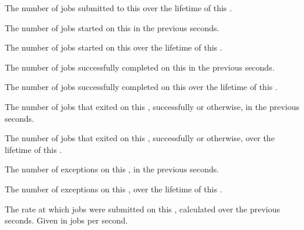 \begin{description}
\item[\AdAttr{JobsSubmittedCumulative}:] The number of jobs submitted to
  this  over the lifetime of this .

\item[\AdAttr{JobsStarted}:] The number of jobs started on this
   in the previous  seconds.

\item[\AdAttr{JobsStartedCumulative}:] The number of jobs started on this
   over the lifetime of this .

\item[\AdAttr{JobsCompleted}:] The number of jobs successfully completed
  on this  in the previous  seconds.

\item[\AdAttr{JobsCompletedCumulative}:] The number of jobs 
  successfully completed on this  over the lifetime of this 
  .

\item[\AdAttr{JobsExited}:] The number of jobs that exited
  on this , successfully or otherwise, in the 
  previous  seconds.

\item[\AdAttr{JobsExitedCumulative}:] The number of jobs that exited
  on this , successfully or otherwise, over
  the lifetime of this .

\item[\AdAttr{ShadowExceptions}:] The number of  exceptions 
  on this , 
  in the previous  seconds.

\item[\AdAttr{ShadowExceptionsCumulative}:] The number of  
  exceptions on this , over the lifetime of this .

\item[\AdAttr{JobSubmissionRate}:] The rate at which jobs were
  submitted on this , 
  calculated over the previous  seconds.
  Given in jobs per second.


\end{description}
